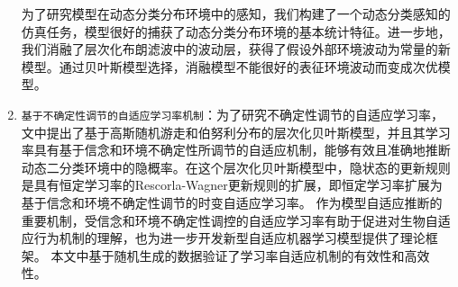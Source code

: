 \begin{enumerate}
	为了研究模型在动态分类分布环境中的感知，我们构建了一个动态分类感知的仿真任务，模型很好的捕获了动态分类分布环境的基本统计特征。进一步地，我们消融了层次化布朗滤波中的波动层，获得了假设外部环境波动为常量的新模型。通过贝叶斯模型选择，消融模型不能很好的表征环境波动而变成次优模型。
	\item {\verb|基于不确定性调节的自适应学习率机制|}：为了研究不确定性调节的自适应学习率，文中提出了基于高斯随机游走和伯努利分布的层次化贝叶斯模型，并且其学习率具有基于信念和环境不确定性所调节的自适应机制，能够有效且准确地推断动态二分类环境中的隐概率。在这个层次化贝叶斯模型中，隐状态的更新规则是具有恒定学习率的Rescorla-Wagner更新规则的扩展，即恒定学习率扩展为基于信念和环境不确定性调节的时变自适应学习率。
	作为模型自适应推断的重要机制，受信念和环境不确定性调控的自适应学习率有助于促进对生物自适应行为机制的理解，也为进一步开发新型自适应机器学习模型提供了理论框架。
	本文中基于随机生成的数据验证了学习率自适应机制的有效性和高效性。
\end{enumerate}



